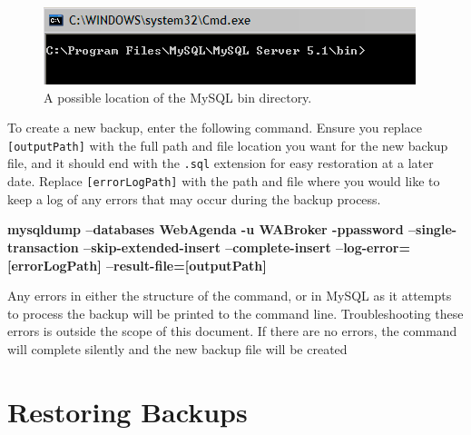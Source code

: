 \documentclass[a4paper,10pt]{report}
\begin{document}
\begin{figure}[h!]
	\begin{center}
	\includegraphics{backupPath.png}
	\end{center}
	\caption{A possible location of the MySQL bin directory.}
	\label{binPath}
\end{figure}

\par \noindent \hspace*{1cm} To create a new backup, enter the following command. Ensure you replace \verb|[outputPath]| with the full path and file location you want for the new backup file, and it should end with the \verb|.sql| extension for easy restoration at a later date. Replace \verb|[errorLogPath]| with the path and file where you would like to keep a log of any errors that may occur during the backup process.
\bigskip
\par \noindent \textbf{mysqldump --databases WebAgenda -u WABroker -ppassword --single-transaction --skip-extended-insert --complete-insert --log-error=[errorLogPath] --result-file=[outputPath]}
\bigskip
\par \noindent \hspace*{1cm} Any errors in either the structure of the command, or in MySQL as it attempts to process the backup will be printed to the command line.  Troubleshooting these errors is outside the scope of this document.  If there are no errors, the command will complete silently and the new backup file will be created

\section{Restoring Backups} 
\end{document}
